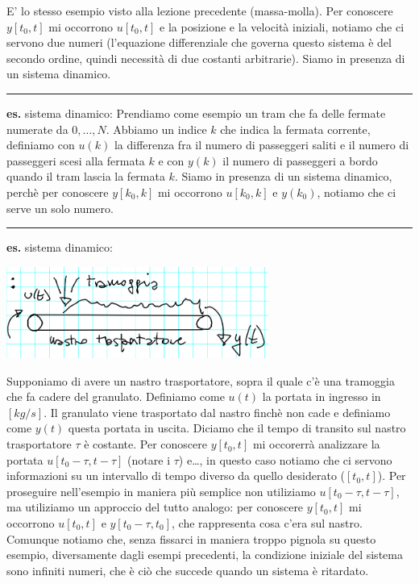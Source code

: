 E' lo stesso esempio visto alla lezione precedente (massa-molla). Per conoscere $y[t_0,t]$ mi occorrono $u[t_0,t]$ e la posizione e la velocità iniziali, notiamo che ci servono due numeri (l'equazione differenziale che governa questo sistema è del secondo ordine, quindi necessità di due costanti arbitrarie). Siamo in presenza di un sistema dinamico.\newline
\rule{\textwidth}{0,4pt}\newline
\newline
\textbf{es.} sistema dinamico:\newline
Prendiamo come esempio un tram che fa delle fermate numerate da $0, \dots, N$. Abbiamo un indice $k$ che indica la fermata corrente, definiamo con $u(k)$ la differenza fra il numero di passeggeri saliti e il numero di passeggeri scesi alla fermata $k$ e con $y(k)$ il numero di passeggeri a bordo quando il tram lascia la fermata $k$. Siamo in presenza di un sistema dinamico, perchè per conoscere $y[k_0,k]$ mi occorrono $u[k_0,k]$ e $y(k_0)$, notiamo che ci serve un solo numero.\newline
\rule{\textwidth}{0,4pt}\newline
\newline
\textbf{es.} sistema dinamico:
\begin{center}
    \includegraphics[height=3cm]{../lezione2/img5.PNG}
\end{center}
Supponiamo di avere un nastro trasportatore, sopra il quale c'è una tramoggia che fa cadere del granulato. Definiamo come $u(t)$ la portata in ingresso in $[kg/s]$. Il granulato viene trasportato dal nastro finchè non cade e definiamo come $y(t)$ questa portata in uscita. Diciamo che il tempo di transito sul nastro trasportatore $\tau$ è costante.\newline
Per conoscere $y[t_0,t]$ mi occorerrà analizzare la portata $u[t_0-\tau,t-\tau]$ (notare i $\tau$) e\dots, in questo caso notiamo che ci servono informazioni su un intervallo di tempo diverso da quello desiderato ($[t_0,t]$). Per proseguire nell'esempio in maniera più semplice non utiliziamo $u[t_0-\tau,t-\tau]$, ma utiliziamo un approccio del tutto analogo: per conoscere $y[t_0,t]$ mi occorrono $u[t_0,t]$ e $y[t_0-\tau,t_0]$, che rappresenta cosa c'era sul nastro. Comunque notiamo che, senza fissarci in maniera troppo pignola su questo esempio, diversamente dagli esempi precedenti, la condizione iniziale del sistema sono infiniti numeri, che è ciò che succede quando un sistema è ritardato.\newline
